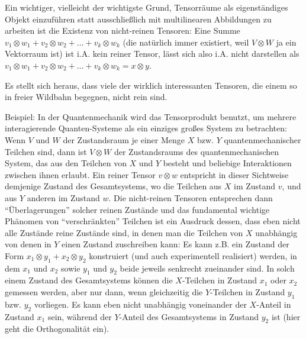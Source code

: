 \begin{remark}
Ein wichtiger, vielleicht der wichtigste Grund, Tensorräume als eigenständiges Objekt einzuführen statt ausschließlich mit multilinearen Abbildungen zu arbeiten ist die Existenz von nicht-reinen Tensoren: Eine Summe $v_1\otimes w_1 + v_2\otimes w_2 + \ldots + v_k\otimes w_k$ (die natürlich immer existiert, weil $V\otimes W$ ja ein Vektorraum ist) ist i.A. kein reiner Tensor, lässt sich also i.A. nicht darstellen als $v_1\otimes w_1 + v_2\otimes w_2 + \ldots + v_k\otimes w_k = x\otimes y$.

\medbreak
Es stellt sich heraus, dass viele der wirklich interessanten Tensoren, die einem so in freier Wildbahn begegnen, nicht rein sind.

Beispiel: In der Quantenmechanik wird das Tensorprodukt benutzt, um mehrere interagierende Quanten-Systeme als ein einziges großes System zu betrachten: Wenn $V$ und $W$ der Zustandsraum je einer Menge $X$ bzw. $Y$ quantenmechanischer Teilchen sind, dann ist $V\otimes W$ der Zustandsraums des quantenmechanischen System, das aus den Teilchen von $X$ und $Y$ besteht und beliebige Interaktionen zwischen ihnen erlaubt. Ein reiner Tensor $v\otimes w$ entspricht in dieser Sichtweise demjenige Zustand des Gesamtsystems, wo die Teilchen aus $X$ im Zustand $v$, und aus $Y$ anderen im Zustand $w$. Die nicht-reinen Tensoren entsprechen dann \enquote{Überlagerungen} solcher reinen Zustände und das fundamental wichtige Phänomen von \enquote{verschränkten} Teilchen ist ein Ausdruck dessen, dass eben nicht alle Zustände reine Zustände sind, in denen man die Teilchen von $X$ unabhängig von denen in $Y$ einen Zustand zuschreiben kann: Es kann z.B. ein Zustand der Form $x_1\otimes y_1 + x_2\otimes y_2$ konstruiert (und auch experimentell realisiert) werden, in dem $x_1$ und $x_2$ sowie $y_1$ und $y_2$ beide jeweils senkrecht zueinander sind. In solch einem Zustand des Gesamtsystems können die $X$-Teilchen in Zustand $x_1$ oder $x_2$ gemessen werden, aber nur dann, wenn gleichzeitig die $Y$-Teilchen in Zustand $y_1$ bzw. $y_2$ vorliegen. Es kann eben nicht unabhängig voneinander der $X$-Anteil in Zustand $x_1$ sein, während der $Y$-Anteil des Gesamtsystems in Zustand $y_2$ ist (hier geht die Orthogonalität ein).
\end{remark}

